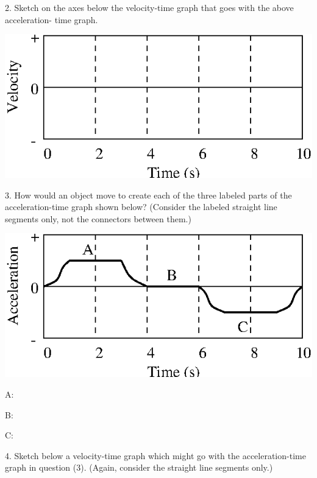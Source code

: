 2. Sketch on the axes below the velocity-time graph that goes with the above
acceleration- time graph.

\vspace{0.3cm}
{\par\centering \includegraphics{slowing/slowing_fig7.eps} \par}
\vspace{0.3cm}

3. How would an object move to create each of the three labeled parts of the
acceleration-time graph shown below? (Consider the labeled straight line segments only, not the connectors between them.)

\vspace{0.3cm}
{\par\centering \includegraphics{slowing/slowing_fig8.eps} \par}
\vspace{0.3cm}

A: 
\vspace{10mm}

B: 
\vspace{10mm}

C:
\vspace{30mm}

4. Sketch below a velocity-time graph which might go with the acceleration-time
graph in question (3). (Again, consider the straight line segments only.)

